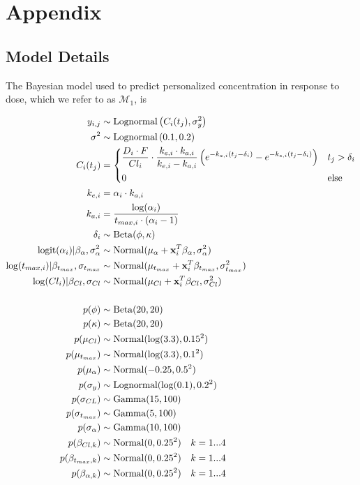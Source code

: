 \section{Appendix}\label{ap:appendix}

\subsection{Model Details}

The Bayesian model used to predict personalized concentration in response to dose, which we refer to as $ \mathcal{M}_1 $, is 

\begin{align}\label{model_M1}
	y_{i,j} &\sim \operatorname{Lognormal}  \left(  C_i(t_j)  , \sigma^2_y \right)  \\
	\sigma^2 &\sim \operatorname{Lognormal} \left( 0.1, 0.2 \right)\\	
	C_i(t_j) &= \begin{dcases}
	\frac{D_{i} \cdot F}{C l_{i}} \cdot \frac{k_{e, i} \cdot k_{a, i}}{k_{e, i}-k_{a, i}}\left(e^{-k_{a, i}\left(t_{j}-\delta_{i}\right)}-e^{-k_{e, i}\left(t_{j}-\delta_{i}\right)}\right) & t_j>\delta_i \\
	0 & \mbox{else}
	\end{dcases}\\
	k_{e,i} &= \alpha_i \cdot k_{a,i}\\
	k_{a,i} &= \dfrac{\log(\alpha_i)}{t_{max, i}\cdot(\alpha_i-1)}\\
	\delta_i &\sim \operatorname{Beta}(\phi, \kappa) \\
	\operatorname{logit}(\alpha_i) \vert \beta_\alpha, \sigma^2_\alpha &\sim \operatorname{Normal}(\mu_\alpha + \mathbf{x}_i^T \beta_\alpha, \sigma^2_\alpha)\\
	\log(t_{max, i}) \vert \beta_{t_{max}}, \sigma_{t_{max}} &\sim \operatorname{Normal}(\mu_{t_{max}} + \mathbf{x}^T_i \beta_{t_{max}}, \sigma^2_{t_{max}}) \\
	\log(Cl_i) \vert \beta_{Cl}, \sigma_{Cl} &\sim \operatorname{Normal}(\mu_{Cl} + \mathbf{x}^T_i \beta_{Cl}, \sigma^2_{Cl}) \\ \nonumber \\
	p(\phi) &\sim \operatorname{Beta}(20, 20)\\
	p(\kappa) &\sim \operatorname{Beta}(20, 20)\\
	p(\mu_{Cl}) &\sim \operatorname{Normal}(\log(3.3), 0.15^2)\\
	p(\mu_{t_{max}}) &\sim \operatorname{Normal}(\log(3.3), 0.1^2)\\
	p(\mu_{\alpha}) &\sim \operatorname{Normal}(-0.25, 0.5^2)\\
	p(\sigma_y) &\sim \operatorname{Lognormal}(\log(0.1), 0.2^2)\\
	p(\sigma_{CL}) &\sim \operatorname{Gamma}(15, 100)\\
	p(\sigma_{t_{max}}) &\sim \operatorname{Gamma}(5, 100)\\
	p(\sigma_{\alpha}) &\sim \operatorname{Gamma}(10, 100)\\
	p(\beta_{Cl, k}) &\sim \operatorname{Normal}(0, 0.25^2) \quad k = 1 ...	 4\\
	p(\beta_{t_{max}, k}) &\sim \operatorname{Normal}(0, 0.25^2) \quad k = 1 ... 4\\	
	p(\beta_{\alpha, k}) &\sim \operatorname{Normal}(0, 0.25^2) \quad k = 1 ... 4
\end{align}

